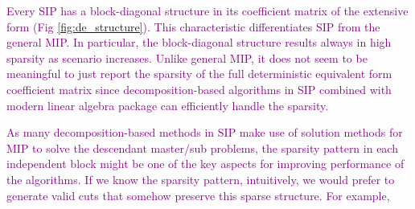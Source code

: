 \textcolor{purple}{Every SIP has a block-diagonal structure in its coefficient matrix of the extensive form (Fig \ref{fig:de_structure}). This characteristic differentiates SIP from the general MIP. In particular, the block-diagonal structure results always in high sparsity as scenario increases. Unlike general MIP, it does not seem to be meaningful to just report the sparsity of the full deterministic equivalent form coefficient matrix since decomposition-based algorithms in SIP combined with modern linear algebra package can efficiently handle the sparsity.}


\textcolor{purple}{As many decomposition-based methods in SIP make use of solution methods for MIP to solve the descendant master/sub problems, the sparsity pattern in each independent block might be one of the key aspects for improving performance of the algorithms. If we know the sparsity pattern, intuitively, we would prefer to generate valid cuts that somehow preserve this sparse structure. For example, }













